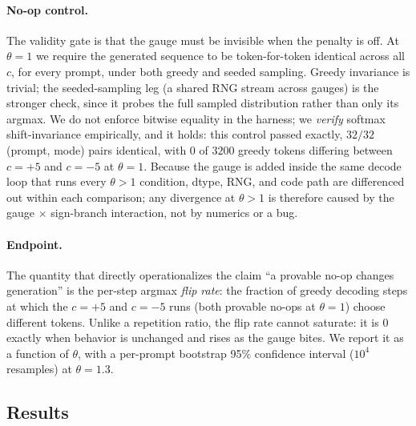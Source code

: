 \documentclass[11pt]{article}
\newcommand{\thp}{\theta}
\begin{document}
\paragraph{No-op control.} The validity gate is that the gauge must be invisible when the
penalty is off. At $\thp=1$ we require the generated sequence to be token-for-token
identical across all $c$, for every prompt, under both greedy and seeded sampling. Greedy
invariance is trivial; the seeded-sampling leg (a shared RNG stream across gauges) is the
stronger check, since it probes the full sampled distribution rather than only its argmax.
We do not enforce bitwise equality in the harness; we \emph{verify} softmax shift-invariance
empirically, and it holds: this control passed exactly, $32/32$ (prompt, mode) pairs
identical, with $0$ of $3200$ greedy tokens differing between $c=+5$ and $c=-5$ at
$\thp=1$. Because the gauge is added inside the same decode loop that runs every $\thp>1$
condition, dtype, RNG, and code path are differenced out within each comparison; any
divergence at $\thp>1$ is therefore caused by the gauge $\times$ sign-branch interaction, not by
numerics or a bug.

\paragraph{Endpoint.} The quantity that directly operationalizes the claim ``a provable
no-op changes generation'' is the per-step argmax \emph{flip rate}: the fraction of greedy
decoding steps at which the $c=+5$ and $c=-5$ runs (both provable no-ops at $\thp=1$)
choose different tokens. Unlike a repetition ratio, the flip rate cannot saturate: it is
$0$ exactly when behavior is unchanged and rises as the gauge bites. We report it as a
function of $\thp$, with a per-prompt bootstrap 95\% confidence interval ($10^4$
resamples) at $\thp=1.3$.

\subsection{Results}
\label{sec:a1-results}
\end{document}
